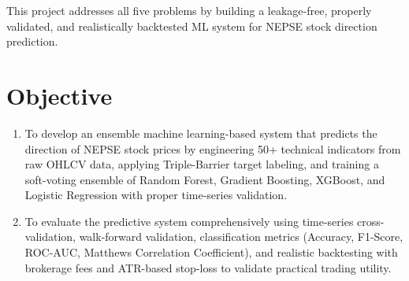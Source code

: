 \documentclass[12pt, a4paper]{report}
\begin{document}
	This project addresses all five problems by building a leakage-free, properly validated, and realistically backtested ML system for NEPSE stock direction prediction.
	
	\section{Objective}
	\begin{enumerate}
		\renewcommand{\labelenumi}{\roman{enumi}.}
		\item To develop an ensemble machine learning-based system that predicts the direction of NEPSE stock prices by engineering 50+ technical indicators from raw OHLCV data, applying Triple-Barrier target labeling, and training a soft-voting ensemble of Random Forest, Gradient Boosting, XGBoost, and Logistic Regression with proper time-series validation.
		\item To evaluate the predictive system comprehensively using time-series cross-validation, walk-forward validation, classification metrics (Accuracy, F1-Score, ROC-AUC, Matthews Correlation Coefficient), and realistic backtesting with brokerage fees and ATR-based stop-loss to validate practical trading utility.
	\end{enumerate}
	
\end{document}
